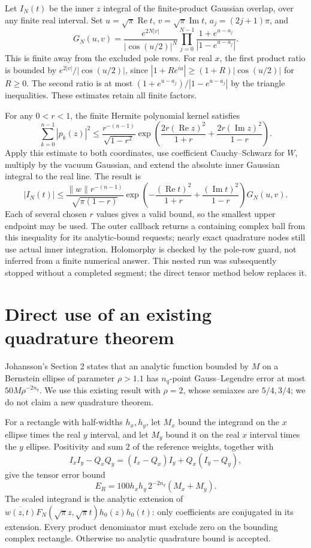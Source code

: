 \documentclass[11pt,a4paper]{article}
\begin{document}
Let $I_N(t)$ be the inner $z$ integral of the finite-product Gaussian
overlap, over any finite real interval. Set $u=\sqrt\pi\operatorname{Re}t$,
$v=\sqrt\pi\operatorname{Im}t$, $a_j=(2j+1)\pi$, and
\[
 G_N(u,v)=\frac{e^{2N|v|}}{|\cos(u/2)|^N}
       \prod_{j=0}^{N-1}\frac{1+e^{u-a_j}}{|1-e^{u-a_j}|}.
\]
This is finite away from the excluded pole rows. For real $x$, the
first product ratio is bounded by $e^{2|v|}/|\cos(u/2)|$, since
$|1+Re^{iu}|\ge(1+R)|\cos(u/2)|$ for $R\ge0$.
The second ratio is at most $(1+e^{u-a_j})/|1-e^{u-a_j}|$ by the
triangle inequalities. These estimates retain all finite factors.

For any $0<r<1$, the finite Hermite polynomial kernel satisfies
\[
 \sum_{k=0}^{n-1}|p_k(z)|^2
 \le\frac{r^{-(n-1)}}{\sqrt{1-r^2}}
 \exp\left(\frac{2r(\operatorname{Re}z)^2}{1+r}
           +\frac{2r(\operatorname{Im}z)^2}{1-r}\right).
\]
Apply this estimate to both coordinates, use coefficient
Cauchy--Schwarz for $W$, multiply by the vacuum Gaussian, and extend
the absolute inner Gaussian integral to the real line. The result is
\[
 |I_N(t)|\le
 \frac{\|w\|r^{-(n-1)}}{\sqrt{\pi(1-r)}}
 \exp\left(-\frac{(\operatorname{Re}t)^2}{1+r}
              +\frac{(\operatorname{Im}t)^2}{1-r}\right)
 G_N(u,v).
\]
Each of several chosen $r$ values gives a valid bound, so the smallest
upper endpoint may be used. The outer callback returns a containing
complex ball from this inequality for its analytic-bound requests;
nearly exact quadrature nodes still use actual inner integration.
Holomorphy is checked by the pole-row guard, not inferred from a
finite numerical answer. This nested run was subsequently stopped
without a completed segment; the direct tensor method below replaces it.

\newpage
\section{Direct use of an existing quadrature theorem}
Johansson's Section 2 \cite{johansson} states that an analytic function
bounded by $M$ on a Bernstein ellipse of parameter $\rho>1.1$ has
$n_q$-point Gauss--Legendre error at most $50M\rho^{-2n_q}$.
We use this existing result with $\rho=2$, whose semiaxes are $5/4,3/4$;
we do not claim a new quadrature theorem.

For a rectangle with half-widths $h_x,h_y$, let $M_x$ bound the
integrand on the $x$ ellipse times the real $y$ interval, and let $M_y$
bound it on the real $x$ interval times the $y$ ellipse. Positivity
and sum $2$ of the reference weights, together with
\[
 I_xI_y-Q_xQ_y=(I_x-Q_x)I_y+Q_x(I_y-Q_y),
\]
give the tensor error bound
\[
 E_R=100h_xh_y\,2^{-2n_q}(M_x+M_y).
\]
The scaled integrand is the analytic extension of
$\overline{w(z,t)}F_N(\sqrt\pi z,\sqrt\pi t)h_0(z)h_0(t)$:
only coefficients are conjugated in its extension.
Every product denominator must exclude zero on the bounding complex
rectangle. Otherwise no analytic quadrature bound is accepted.
\end{document}
